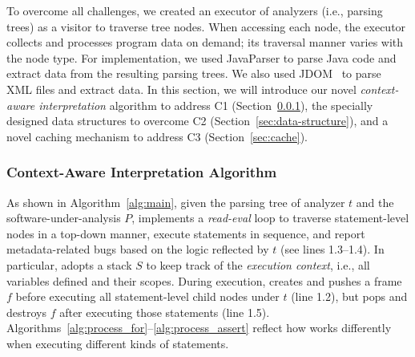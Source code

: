 To overcome all challenges, we created an
executor of analyzers (i.e., parsing trees) as 
a visitor to traverse tree nodes. 
When accessing each node, the executor collects and processes program data on demand; its traversal manner varies with the node type. 
For implementation, 
we used JavaParser \cite{javaparser} to parse Java code and extract data from the resulting parsing trees. We also used JDOM~\cite{oracle2014xmlparsers} to parse XML files and extract data. 
In this section, we will introduce our novel \emph{context-aware interpretation} algorithm to address C1 (Section~\ref{sec:alg}), the specially designed data structures to overcome C2 (Section~\ref{sec:data-structure}), and a novel caching mechanism to address C3 (Section~\ref{sec:cache}). 





\subsubsection{Context-Aware Interpretation Algorithm}\label{sec:alg}
As shown in Algorithm~\ref{alg:main}, 
given the parsing tree of analyzer $t$ and the software-under-analysis $P$, \tool implements a \emph{read-eval} loop to traverse statement-level nodes in a top-down manner, execute statements in sequence, and report
metadata-related bugs based on the logic reflected by $t$ (see lines 1.3--1.4). 
In particular, \tool adopts a stack $S$ to keep track of the \emph{execution context}, i.e., all variables defined and their scopes. During execution, \tool creates and pushes a frame $f$ before executing all statement-level child nodes under $t$ (line 1.2), 
but pops and destroys $f$ after executing those statements (line 1.5). 
Algorithms~\ref{alg:process_for}--\ref{alg:process_assert} reflect how \tool works differently when executing different kinds of statements. 


